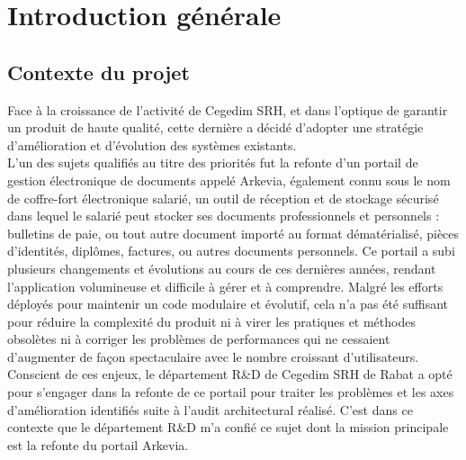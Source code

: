 {}
\noindent \section*{Introduction générale}

{}
\subsection*{Contexte du projet}
Face à la croissance de l'activité de Cegedim SRH, et dans l’optique de garantir un produit de haute qualité, cette dernière a décidé d’adopter une stratégie d’amélioration et d’évolution des systèmes existants.\\

L'un des sujets qualifiés au titre des priorités fut la refonte d'un portail de gestion électronique de documents appelé Arkevia, également connu sous le nom de coffre-fort électronique salarié, un outil de réception et de stockage sécurisé dans lequel le salarié peut stocker ses documents professionnels et personnels : bulletins de paie, ou tout autre document importé au format dématérialisé, pièces d'identités, diplômes, factures, ou autres documents personnels. Ce portail a subi plusieurs changements et évolutions au cours de ces dernières années, rendant l'application volumineuse et difficile à gérer et à comprendre. Malgré les efforts déployés pour maintenir un code modulaire et évolutif, cela n'a pas été suffisant pour réduire la complexité du produit ni à virer les pratiques et méthodes obsolètes ni à corriger les problèmes de performances qui ne cessaient d'augmenter de façon spectaculaire avec le nombre croissant d'utilisateurs.\\

Conscient de ces enjeux, le département R\&D de Cegedim SRH de Rabat a opté pour s'engager dans la refonte de ce portail pour traiter les problèmes et les axes d’amélioration identifiés suite à l’audit architectural réalisé. C'est dans ce contexte que le département R\&D m'a confié ce sujet dont la mission principale est la refonte du portail Arkevia.
